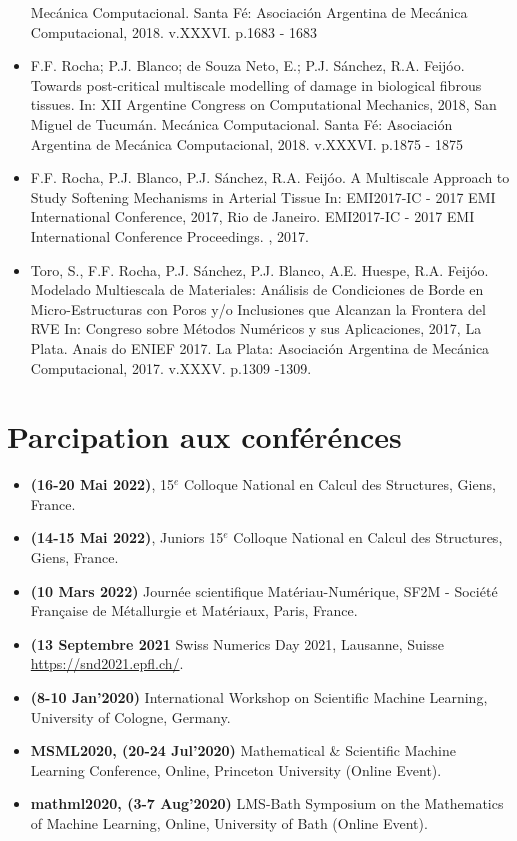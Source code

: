 \documentclass[french]{article}
\begin{document}
\begin{itemize}
	Mecánica Computacional. Santa Fé: Asociación Argentina de Mecánica Computacional, 2018. v.XXXVI.
	p.1683 - 1683
	\item F.F. Rocha; P.J. Blanco; de Souza Neto, E.; P.J. Sánchez, R.A. Feijóo.
	Towards post-critical multiscale modelling of damage in biological fibrous tissues.
	In: XII Argentine Congress on Computational Mechanics, 2018, San Miguel de Tucumán.
	Mecánica Computacional. Santa Fé: Asociación Argentina de Mecánica Computacional, 2018. v.XXXVI.
	p.1875 - 1875
	\item F.F. Rocha, P.J. Blanco, P.J. Sánchez, R.A. Feijóo.
	A Multiscale Approach to Study Softening Mechanisms in Arterial Tissue In: EMI2017-IC - 2017 EMI
	International Conference, 2017, Rio de Janeiro. EMI2017-IC - 2017 EMI International Conference Proceedings. , 2017.
	\item Toro, S., F.F. Rocha, P.J. Sánchez, P.J. Blanco, A.E. Huespe, R.A. Feijóo.
	Modelado Multiescala de Materiales: Análisis de Condiciones de Borde en Micro-Estructuras con Poros y/o
	Inclusiones que Alcanzan la Frontera del RVE In: Congreso sobre Métodos Numéricos y sus Aplicaciones,
	2017, La Plata. Anais do ENIEF 2017. La Plata: Asociación Argentina de Mecánica Computacional, 2017. v.XXXV. p.1309 -1309.
\end{itemize}



\section{Parcipation aux conférénces}
\begin{itemize} 
\item \textbf{(16-20 Mai 2022)}, 15$^{e}$ Colloque National en Calcul des Structures, Giens, France.
\item \textbf{(14-15 Mai 2022)}, Juniors 15$^{e}$ Colloque National en Calcul des Structures, Giens, France.
\item \textbf{(10 Mars 2022)} Journée scientifique Matériau-Numérique, SF2M - Société  Française de Métallurgie et Matériaux, Paris, France.
\item \textbf{(13 Septembre 2021} Swiss Numerics Day 2021, Lausanne, Suisse  \url{https://snd2021.epfl.ch/}. 
\item \textbf{(8-10 Jan'2020)} International Workshop on Scientific Machine Learning, University of Cologne, Germany.
\item \textbf{MSML2020, (20-24 Jul'2020)}  Mathematical \& Scientific Machine Learning Conference, Online, Princeton University (Online Event).
\item \textbf{mathml2020, (3-7 Aug'2020)}  LMS-Bath Symposium on the Mathematics of Machine Learning, Online, University of Bath (Online Event).
\end{itemize}
\end{document}
